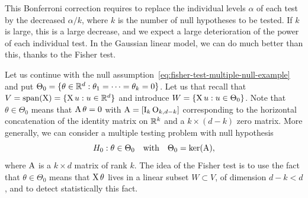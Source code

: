 This Bonferroni correction requires to replace the individual levels $\alpha$ of each test by the decreased $\alpha /k$, where $k$ is the number of null hypotheses to be tested.
If $k$ is large, this is a large decrease, and we expect a large deterioration of the power of each individual test.
In the Gaussian linear model, we can do much better than this, thanks to the Fisher test.

Let us continue with the null assumption~\eqref{eq:fisher-test-multiple-null-example} and put $\Theta_0 = \{ \theta \in \mathbb R^d : \theta_1 = \cdots = \theta_k = 0 \}$. 
Let us that recall that $V = \operatorname*{span}(\operatorname{{\boldsymbol X}}) = \{ \operatorname{{\boldsymbol X}} u : u \in \mathbb R^d\}$ and introduce $W = \{ \operatorname{{\boldsymbol X}} u : u \in \Theta_0 \}$. 
Note that $\theta \in \Theta_0$ means that $\operatorname{{\boldsymbol A}} \theta = 0$ with $\operatorname{{\boldsymbol A}} = [\operatorname{{\boldsymbol I}}_k \operatorname{{\boldsymbol O}}_{k, d-k}]$ corresponding to the horizontal concatenation of the identity matrix on $\mathbb R^k$ and a $k \times (d-k)$ zero matrix.
More generally, we can consider a multiple testing problem with null hypothesis
\begin{equation}
	\label{eq:fisher-null-hypothesis}
	H_0 : \theta \in \Theta_0 \quad \text{with} \quad \Theta_0 = \ker(\operatorname{{\boldsymbol A}}),
\end{equation}
where $\operatorname{{\boldsymbol A}}$ is a $k \times d$ matrix of rank $k$.
The idea of the Fisher test is to use the fact that $\theta \in \Theta_0$ means that $\operatorname{{\boldsymbol X}} \theta$ lives in a linear subset $W \subset V$, of dimension $d - k < d$, and to detect statistically this fact.

